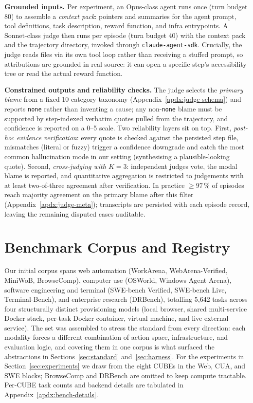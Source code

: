 \documentclass{article}
\newcommand{\mypar}[1]{\par\noindent\textbf{#1}\enspace}
\begin{document}
\mypar{Grounded inputs.}
Per experiment, an Opus-class agent runs once (turn budget 80) to
assemble a \emph{context pack}: pointers and summaries for the agent
prompt, tool definitions, task description, reward function, and
infra entrypoints. A Sonnet-class judge then runs per episode (turn
budget 40) with the context pack and the trajectory directory,
invoked through \texttt{claude-agent-sdk}. Crucially, the judge reads
files via its own tool loop rather than receiving a stuffed prompt,
so attributions are grounded in real source: it can open a specific
step's accessibility tree or read the actual reward function.

\mypar{Constrained outputs and reliability checks.}
The judge selects the \emph{primary blame} from a fixed 10-category
taxonomy (Appendix~\ref{apdx:judge-schema}) and reports \texttt{none}
rather than inventing a cause; any non-\texttt{none} blame must be
supported by step-indexed verbatim quotes pulled from the trajectory,
and confidence is reported on a 0--5 scale. Two reliability layers
sit on top. First, \emph{post-hoc evidence verification}: every quote
is checked against the persisted step file, mismatches (literal or
fuzzy) trigger a confidence downgrade and catch the most common
hallucination mode in our setting (synthesising a plausible-looking
quote). Second, \emph{cross-judging with $K=3$}: independent judges
vote, the modal blame is reported, and quantitative aggregation is
restricted to judgements with at least two-of-three agreement after
verification. In practice $\geq 97\,\%$ of episodes reach
majority agreement on the primary blame after this filter
(Appendix~\ref{apdx:judge-meta}); transcripts are persisted with
each episode record, leaving the remaining disputed cases auditable.


\section{Benchmark Corpus and Registry}
\label{sec:corpus}

Our initial corpus spans web automation (WorkArena, WebArena-Verified,
MiniWoB, BrowseComp), computer use (OSWorld, Windows Agent Arena),
software engineering and terminal (SWE-bench Verified, SWE-bench Live,
Terminal-Bench), and enterprise research (DRBench), totalling 5{,}642
tasks across four structurally distinct provisioning models (local
browser, shared multi-service Docker stack, per-task Docker container,
virtual machine, and live external service). The set was assembled to
stress the standard from every direction: each modality forces a
different combination of action space, infrastructure, and evaluation
logic, and covering them in one corpus is what surfaced the abstractions
in Sections~\ref{sec:standard} and~\ref{sec:harness}. For the experiments
in Section~\ref{sec:experiments} we draw from the eight CUBEs in the Web,
CUA, and SWE blocks; BrowseComp and DRBench are omitted to keep compute
tractable. Per-CUBE task counts and backend details are tabulated in
Appendix~\ref{apdx:bench-details}.
\end{document}
